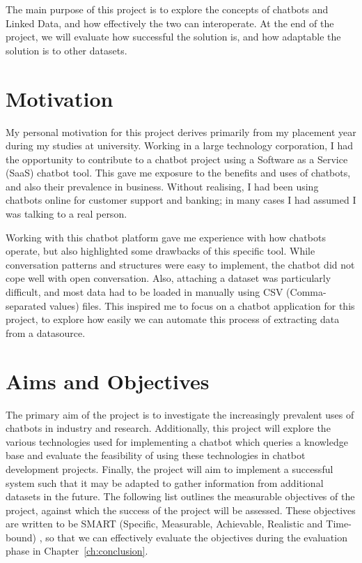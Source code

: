 The main purpose of this project is to explore the concepts of chatbots and Linked Data, and how effectively the two can interoperate. At the end of the project, we will evaluate how successful the solution is, and how adaptable the solution is to other datasets.

\section{Motivation}
My personal motivation for this project derives primarily from my placement year during my studies at university. Working in a large technology corporation, I had the opportunity to contribute to a chatbot project using a Software as a Service (SaaS) chatbot tool. This gave me exposure to the benefits and uses of chatbots, and also their prevalence in business. Without realising, I had been using chatbots online for customer support and banking; in many cases I had assumed I was talking to a real person.

Working with this chatbot platform gave me experience with how chatbots operate, but also highlighted some drawbacks of this specific tool. While conversation patterns and structures were easy to implement, the chatbot did not cope well with open conversation. Also, attaching a dataset was particularly difficult, and most data had to be loaded in manually using CSV (Comma-separated values) files. This inspired me to focus on a chatbot application for this project, to explore how easily we can automate this process of extracting data from a datasource.

\newpage
\section{Aims and Objectives}
\label{sec:aims}
The primary aim of the project is to investigate the increasingly prevalent uses of chatbots in industry and research. Additionally, this project will explore the various technologies used for implementing a chatbot which queries a knowledge base and evaluate the feasibility of using these technologies in chatbot development projects. Finally, the project will aim to implement a successful system such that it may be adapted to gather information from additional datasets in the future. The following list outlines the measurable objectives of the project, against which the success of the project will be assessed. These objectives are written to be SMART (Specific, Measurable, Achievable, Realistic and Time-bound) \cite{smart}, so that we can effectively evaluate the objectives during the evaluation phase in Chapter~\ref{ch:conclusion}.

